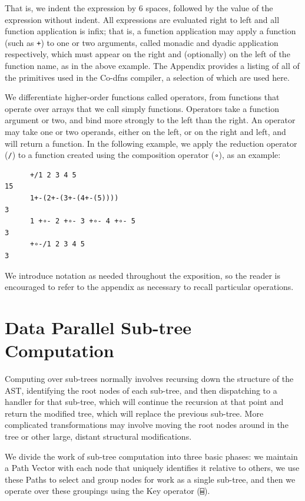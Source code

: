 ﻿\documentclass[numbers,10pt,preprint]{sigplanconf}
\begin{document}
\noindent That is, we indent the expression by 6 spaces, followed by the value of the expression without indent. All expressions are evaluated right to left and all function application is infix; that is, a function application may apply a function (such as \verb;+;) to one or two arguments, called monadic and dyadic application respectively, which must appear on the right and (optionally) on the left of the function name, as in the above example. The Appendix provides a listing of all of the primitives used in the Co-dfns compiler, a selection of which are used here.

We differentiate higher-order functions called operators, from functions that operate over arrays that we call simply functions. Operators take a function argument or two, and bind more strongly to the left than the right. An operator may take one or two operands, either on the left, or on the right and left, and will return a function. In the following example, we apply the reduction operator (\verb;/;) to a function created using the composition operator (\verb;∘;), as an example:

\begin{verbatim}
      +/1 2 3 4 5
15
      1+-(2+-(3+-(4+-(5))))
3
      1 +∘- 2 +∘- 3 +∘- 4 +∘- 5
3
      +∘-/1 2 3 4 5
3
\end{verbatim}

\noindent We introduce notation as needed throughout the exposition, so the reader is encouraged to refer to the appendix as necessary to recall particular operations.

\section{Data Parallel Sub-tree Computation}

Computing over sub-trees normally involves recursing down the structure of the AST, identifying the root nodes of each sub-tree, and then dispatching to a handler for that sub-tree, which will continue the recursion at that point and return the modified tree, which will replace the previous sub-tree. More complicated transformations may involve moving the root nodes around in the tree or other large, distant structural modifications.

We divide the work of sub-tree computation into three basic phases: we maintain a Path Vector with each node that uniquely identifies it relative to others, we use these Paths to select and group nodes for work as a single sub-tree, and then we operate over these groupings using the Key operator (\verb;⌸;).
\end{document}
